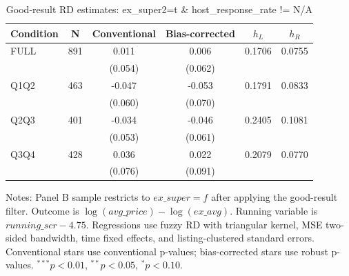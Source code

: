 \begin{table}[!htbp]
\centering
\caption{Good-result RD estimates: ex\_super2=t \& host\_response\_rate != N/A}
\label{tab:good_result_host_response_rate_not_na}
\begin{tabular}{lccccc}
\hline
Condition & N & Conventional & Bias-corrected & $h_L$ & $h_R$ \\
\hline
FULL & 891 & 0.011 & 0.006 & 0.1706 & 0.0755 \\
 &  & (0.054) & (0.062) &  &  \\
Q1Q2 & 463 & -0.047 & -0.053 & 0.1791 & 0.0833 \\
 &  & (0.060) & (0.070) &  &  \\
Q2Q3 & 401 & -0.034 & -0.046 & 0.2405 & 0.1081 \\
 &  & (0.053) & (0.061) &  &  \\
Q3Q4 & 428 & 0.036 & 0.022 & 0.2079 & 0.0770 \\
 &  & (0.076) & (0.091) &  &  \\
\hline
\end{tabular}
\begin{flushleft}
\footnotesize Notes: Panel B sample restricts to $ex\_super=f$ after applying the good-result filter. Outcome is $\log(avg\_price)-\log(ex\_avg)$. Running variable is $running\_scr-4.75$. Regressions use fuzzy RD with triangular kernel, MSE two-sided bandwidth, time fixed effects, and listing-clustered standard errors. Conventional stars use conventional p-values; bias-corrected stars use robust p-values. $^{***}p<0.01$, $^{**}p<0.05$, $^{*}p<0.10$.
\end{flushleft}
\end{table}

